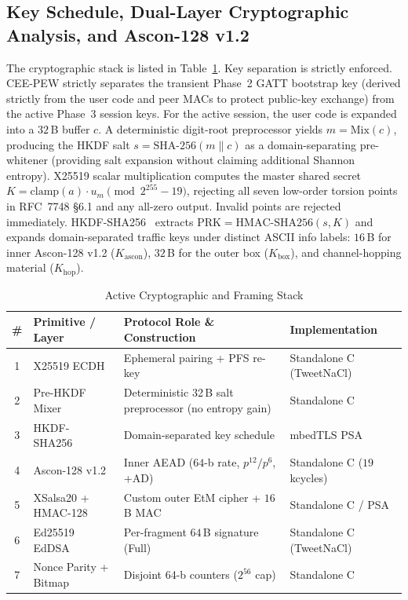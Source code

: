\documentclass[conference]{IEEEtran}
\renewcommand{\arraystretch}{0.96}
\begin{document}
\subsection{Key Schedule, Dual-Layer Cryptographic Analysis, and Ascon-128 v1.2}
The cryptographic stack is listed in Table~\ref{tab:crypto_stack}. Key separation is strictly enforced. CEE-PEW strictly separates the transient Phase~2 GATT bootstrap key (derived strictly from the user code and peer MACs to protect public-key exchange) from the active Phase~3 session keys. For the active session, the user code is expanded into a $32$\,B buffer $c$. A deterministic digit-root preprocessor yields $m = \text{Mix}(c)$, producing the HKDF salt $s = \text{SHA-256}(m \parallel c)$ as a domain-separating pre-whitener (providing salt expansion without claiming additional Shannon entropy). X25519 scalar multiplication computes the master shared secret $K = \text{clamp}(a)\cdot u_m \pmod{2^{255}-19}$, rejecting all seven low-order torsion points in RFC~7748 \S6.1 and any all-zero output. Invalid points are rejected immediately. HKDF-SHA256~\cite{rfc5869} extracts $\text{PRK} = \text{HMAC-SHA256}(s, K)$ and expands domain-separated traffic keys under distinct ASCII info labels: $16$\,B for inner Ascon-128 v1.2 ($K_{\text{ascon}}$), $32$\,B for the outer box ($K_{\text{box}}$), and channel-hopping material ($K_{\text{hop}}$).

\begin{table}[t]
\centering
\caption{Active Cryptographic and Framing Stack}
\label{tab:crypto_stack}
\setlength{\tabcolsep}{3pt}
\scriptsize
\renewcommand{\arraystretch}{0.98}
\begin{tabularx}{\columnwidth}{@{}clXl@{}}
\toprule
\textbf{\#} & \textbf{Primitive / Layer} & \textbf{Protocol Role \& Construction} & \textbf{Implementation} \\
\midrule
1 & X25519 ECDH~\cite{rfc7748} & Ephemeral pairing + PFS re-key & Standalone C (TweetNaCl) \\
2 & Pre-HKDF Mixer & Deterministic 32\,B salt preprocessor (no entropy gain) & Standalone C \\
3 & HKDF-SHA256~\cite{rfc5869} & Domain-separated key schedule & mbedTLS PSA \\
4 & Ascon-128 v1.2~\cite{dobraunig2021} & Inner AEAD ($64$-b rate, $p^{12}/p^6$, +AD) & Standalone C ($19$\,kcycles) \\
5 & XSalsa20 + HMAC-128 & Custom outer EtM cipher + $16$\,B MAC & Standalone C / PSA \\
6 & Ed25519 EdDSA~\cite{bernstein2012} & Per-fragment $64$\,B signature (Full) & Standalone C (TweetNaCl) \\
7 & Nonce Parity + Bitmap & Disjoint 64-b counters ($2^{56}$ cap) & Standalone C \\
\bottomrule
\end{tabularx}
\end{table}
\end{document}

